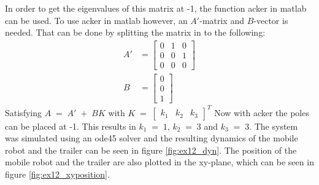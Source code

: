 In order to get the eigenvalues of this matrix at -1, the function acker in matlab can be used. To use acker in matlab however, an $A'$-matrix and $B$-vector is needed. That can be done by splitting the matrix in to the following:
\begin{align}
    A' &= \begin{bmatrix}
    0 & 1 & 0\\
    0 & 0 & 1 \\
    0 & 0 & 0
    \end{bmatrix} \\
    B &= \begin{bmatrix}
    0 \\ 0 \\ 1
    \end{bmatrix}
\end{align}
Satisfying $A\;=\;A'\;+\;BK$ with $K \;= \; \begin{bmatrix} k_1 & k_2 & k_3 \end{bmatrix} ^T $
Now with acker the poles can be placed at -1. This results in $k_1\;=\;1$, $k_2\;=\;3$ and $k_3\;=\;3$. The system was simulated using an ode45 solver and the resulting dynamics of the mobile robot and the trailer can be seen in figure \ref{fig:ex12_dyn}. The position of the mobile robot and the trailer are also plotted in the xy-plane, which can be seen in figure \ref{fig:ex12_xyposition}.

